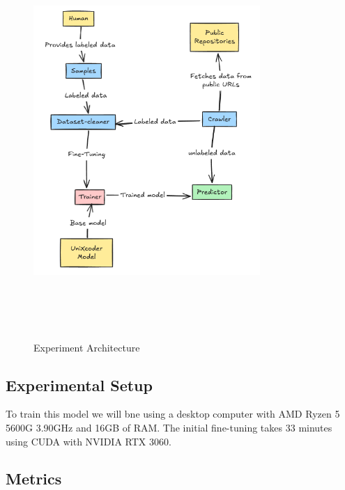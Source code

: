 \documentclass[conference]{IEEEtran}
\begin{document}
\begin{figure}[ht]
    \centering
    \includegraphics[width=8.6cm, height=15cm]{./imgs/modules-interaction.png}
    \caption{Experiment Architecture}
\end{figure}

\subsection{Experimental Setup}
 
To train this model we will bne using a desktop computer with AMD Ryzen 5 5600G 3.90GHz and
16GB of RAM. The initial fine-tuning takes 33 minutes using CUDA with NVIDIA RTX 3060.

\subsection{Metrics}
\end{document}
